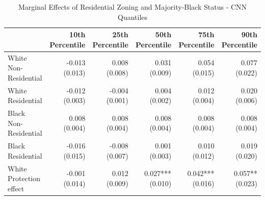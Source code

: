 \begin{table}[h]
\centering
\caption{Marginal Effects of Residential Zoning and Majority-Black Status - CNN Quantiles}
\label{tab:marginal_effects_sweep}
\begin{threeparttable}
\begin{tabular*}{1\textwidth}{@{\extracolsep{\fill}}l*{5}{r}}
\toprule
 & 10th Percentile & 25th Percentile & 50th Percentile & 75th Percentile & 90th Percentile \\
\midrule
White Non-Residential & \makecell[tr]{-0.013 \\ (0.013)} & \makecell[tr]{0.008 \\ (0.008)} & \makecell[tr]{0.031 \\ (0.009)} & \makecell[tr]{0.054 \\ (0.015)} & \makecell[tr]{0.077 \\ (0.022)} \\
White Residential & \makecell[tr]{-0.012 \\ (0.003)} & \makecell[tr]{-0.004 \\ (0.001)} & \makecell[tr]{0.004 \\ (0.002)} & \makecell[tr]{0.012 \\ (0.004)} & \makecell[tr]{0.020 \\ (0.006)} \\
Black Non-Residential & \makecell[tr]{0.008 \\ (0.004)} & \makecell[tr]{0.008 \\ (0.004)} & \makecell[tr]{0.008 \\ (0.004)} & \makecell[tr]{0.008 \\ (0.004)} & \makecell[tr]{0.008 \\ (0.004)} \\
Black Residential & \makecell[tr]{-0.016 \\ (0.015)} & \makecell[tr]{-0.008 \\ (0.007)} & \makecell[tr]{0.001 \\ (0.003)} & \makecell[tr]{0.010 \\ (0.012)} & \makecell[tr]{0.019 \\ (0.020)} \\
White Protection effect & \makecell[tr]{-0.001 \\ (0.014)} & \makecell[tr]{0.012 \\ (0.009)} & \makecell[tr]{0.027{***} \\ (0.010)} & \makecell[tr]{0.042{***} \\ (0.016)} & \makecell[tr]{0.057{**} \\ (0.023)} \\

\end{tabular*}
\end{threeparttable}
\end{table}
